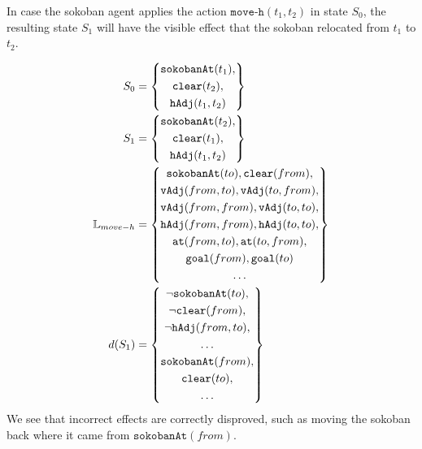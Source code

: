 \documentclass[../Master.tex]{subfiles}
\begin{document}
\begin{example} \label{ex:nca:moveSucceeded-disproving-effects}
	In case the sokoban agent applies the action $\texttt{move-h}(t_1, t_2)$ in state $S_0$, the resulting state $S_1$ will have the visible effect that the sokoban relocated from $t_1$ to $t_2$. 
	
	
	
	\begin{equation*}
		\begin{split}
		S_0 &=
		\left\{
		\begin{gathered}
			\texttt{sokobanAt}(t_1), \\
			\texttt{clear}(t_2),\\
			\texttt{hAdj}(t_1, t_2)	
		\end{gathered}
		\right\} \\
		S_1 &=
		\left\{
		\begin{gathered}
			\texttt{sokobanAt}(t_2), \\
			\texttt{clear}(t_1), \\
			\texttt{hAdj}(t_1, t_2)			
		\end{gathered}
		\right\} \\		
		\mathbb{L}_{move-h} &= \left\{
		\begin{gathered}
			\texttt{sokobanAt}(to), \texttt{clear}(from), \\
			\texttt{vAdj}(from, to), \texttt{vAdj}(to, from), \\
			\texttt{vAdj}(from, from), \texttt{vAdj}(to, to), \\
			\texttt{hAdj}(from, from), \texttt{hAdj}(to, to), \\
			\texttt{at}(from, to), \texttt{at}(to, from), \\
			\texttt{goal}(from), \texttt{goal}(to)  \\
			\dots
		\end{gathered}
		\right\} \\
		d(S_1) &= \left\{
		\begin{gathered}
			\neg \texttt{sokobanAt}(to), \\
			\neg \texttt{clear}(from), \\
			\neg \texttt{hAdj}(from, to), \\
			\dots \\
			\texttt{sokobanAt}(from), \\
			\texttt{clear}(to), \\
			\dots			
		\end{gathered}
		\right\}
		\end{split}
	\end{equation*}
We see that incorrect effects are correctly disproved, such as moving the sokoban back where it came from $\texttt{sokobanAt}(from)$.
\end{example}
\end{document}
